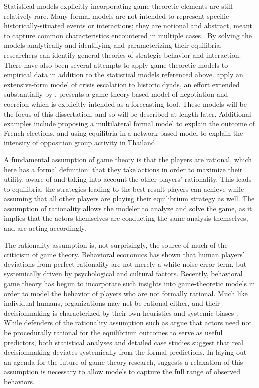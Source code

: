 Statistical models explicitly incorporating game-theoretic elements are still relatively rare. Many formal models are not intended to represent specific historically-situated events or interactions; they are notional and abstract, meant to capture common characteristics encountered in multiple cases \citep{snidal_1985}. By solving the models analytically and identifying and parameterizing their equilibria, researchers can identify general theories of strategic behavior and interaction. There have also been several attempts to apply game-theoretic models to empirical data in addition to the statistical models referenced above. \citet{bdm_1992} apply an extensive-form model of crisis escalation to historic dyads, an effort extended substantially by \citet{bennett_2000}. \citet{bdm_1994,bdm_1997,bdm_2002} presents a game theory based model of negotiation and coercion which is explicitly intended as a forecasting tool. These models will be the focus of this dissertation, and so will be described at length later. Additional examples include \citet{tsebelis_1988} proposing a multilateral formal model to explain the outcome of French elections, and \citet{metternich_2013} using equilibria in a network-based model to explain the intensity of opposition group activity in Thailand.

A fundamental assumption of game theory is that the players are rational, which here has a formal definition: that they take actions in order to maximize their utility, aware of and taking into account the other players' rationality. This leads to equilibria, the strategies leading to the best result players can achieve while assuming that all other players are playing their equilibrium strategy as well. The assumption of rationality allows the modeler to analyze and solve the game, as it implies that the actors themselves are conducting the same analysis themselves, and are acting accordingly.

The rationality assumption is, not surprisingly, the source of much of the criticism of game theory. Behavioral economics has shown that human players' deviations from perfect rationality are not merely a white-noise error term, but systemically driven by psychological \citep{tversky_1981} and cultural \citep{henrich_2005} factors. Recently, behavioral game theory has begun to incorporate such insights into game-theoretic models \citep{camerer_2003} in order to model the behavior of players who are not formally rational. Much like individual humans, organizations may not be rational either, and their decisionmaking is characterized by their own heuristics \citep{march_1993} and systemic biases \citep{shapira_2002}. While defenders of the rationality assumption such as \citet{friedman_1953} argue that actors need not be procedurally rational \citep{simon_1976} for the equilibrium outcomes to serve as useful predictors, both statistical analyses \citep{bennett_2000} and detailed case studies \citep{allison_1999,kaufmann_1994} suggest that real decisionmaking deviates systemically from the formal predictions. In laying out an agenda for the future of game theory research, \citet{fudenberg_2010} suggests a relaxation of this assumption is necessary to allow models to capture the full range of observed behaviors.

